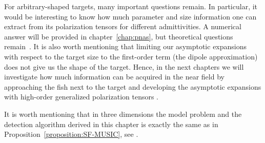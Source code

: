 For arbitrary-shaped targets, many
important questions remain. In particular, it would be interesting
to know how much parameter and size information one can extract
from its polarization tensors for different
admittivities. A numerical answer will be provided in
chapter~\ref{chap:pnas}, but theoretical questions remain~\cite{kang2013IHP}.
It is also worth mentioning that limiting our
asymptotic expansions with respect to the target size to the
first-order term (the dipole approximation) does not give us the
shape of the target. Hence, in the next chapters we will
investigate how much information can be acquired in the near field
by approaching the fish next to the target and developing the
asymptotic expansions with high-order generalized polarization
tensors \cite{ammari2004reconstruction}.


It is worth mentioning that in three dimensions the model problem and
the detection algorithm derived in this chapter is exactly the same
as in Proposition~\ref{proposition:SF-MUSIC}, see \cite{ammari2004reconstruction}.




